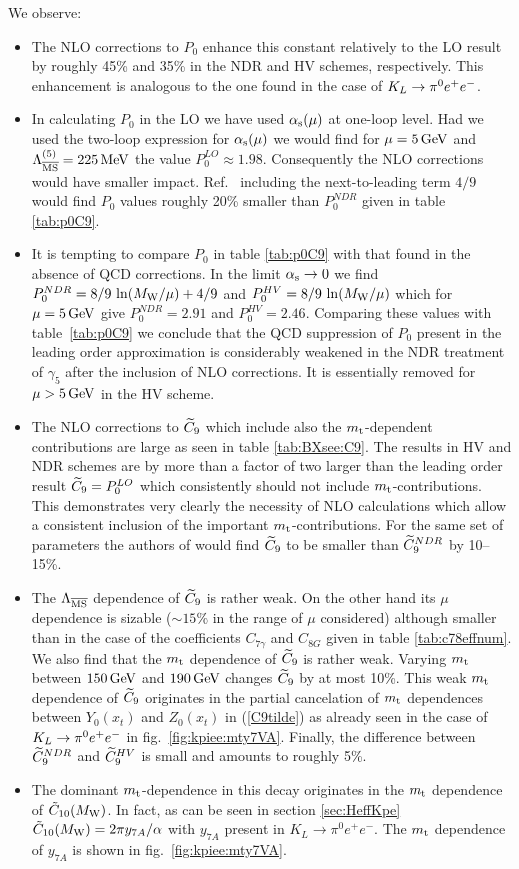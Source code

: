 \noindent
We observe:
\begin{itemize}
\item
The NLO corrections to $P_0$ enhance this constant relatively to the
LO result by roughly 45\% and 35\% in the NDR and HV schemes,
respectively. This enhancement is analogous to the one found in the
case of $K_L \to \pi^0 e^+ e^-$.
\item
In calculating $P_0$ in the LO we have used $\alpha_{\rm s}(\mu)$ at one-loop
level. Had we used the two-loop expression for $\alpha_{\rm s}(\mu)$ we
would find for $\mu=5 \, {\rm GeV}$ and $\Lambda_{\overline{\rm MS}}^{(5)} = 225 \, {\rm MeV}$ the value $P_0^{LO}
\approx 1.98$. Consequently the NLO corrections would have smaller
impact. Ref.~\cite{grinstein:89a} including the next-to-leading term $4/9$
would find $P_0$ values roughly 20\% smaller than $P_0^{NDR}$ given in
table \ref{tab:p0C9}.
\item
It is tempting to compare $P_0$ in table \ref{tab:p0C9} with that found in
the absence of QCD corrections. In the limit $\alpha_{\rm s} \to 0$ we
find $P_0^{NDR} = 8/9 \, \ln(M_{\rm W}/\mu) + 4/9$ and $P_0^{HV} = 8/9\,
\ln(M_{\rm W}/\mu)$ which for $\mu = 5 \, {\rm GeV}$ give $P_0^{NDR} = 2.91$ and
$P_0^{HV} = 2.46$. Comparing these values with table~\ref{tab:p0C9} we
conclude that the QCD suppression of $P_0$ present in the leading order
approximation is considerably weakened in the NDR treatment of
$\gamma_5$ after the inclusion of NLO corrections. It is essentially
removed for $\mu > 5 \, {\rm GeV}$ in the HV scheme.
\item
The NLO corrections to $\widetilde C_9$ which include also the
$m_{\rm t}$-dependent contributions are large as seen in table
\ref{tab:BXsee:C9}. The results in HV and NDR schemes are by more than
a factor of two larger than the leading order result $\widetilde C_9 =
P_0^{LO}$ which consistently should not include $m_{\rm t}$-contributions.
This demonstrates very clearly the necessity of NLO calculations which
allow a consistent inclusion of the important $m_{\rm t}$-contributions. For
the same set of parameters the authors of \cite{grinstein:89a}
would find $\widetilde C_9$ to be smaller than $\widetilde C_9^{NDR}$ by
10--15\%.
\item
The $\Lambda_{\overline{\rm MS}}$ dependence of $\widetilde C_9$ is rather weak.  On the other
hand its $\mu$ dependence is sizable ($\sim 15\%$ in the range of $\mu$
considered) although smaller than in the case of the coefficients
$C_{7\gamma}$ and $C_{8G}$ given in table \ref{tab:c78effnum}.  We also
find that the $m_{\rm t}$ dependence of $\widetilde C_9$ is rather weak. Varying
$m_{\rm t}$ between $150 \, {\rm GeV}$ and $190 \, {\rm GeV}$ changes $\widetilde C_9$ by at most
10\%. This weak $m_{\rm t}$ dependence of $\widetilde C_9$ originates in the
partial cancelation of $m_{\rm t}$ dependences between $Y_0(x_t)$ and
$Z_0(x_t)$ in (\ref{C9tilde}) as already seen in the case of $K_L \to \pi^0 e^+ e^-$
in fig.\ \ref{fig:kpiee:mty7VA}. Finally, the difference between
$\widetilde C_9^{NDR}$ and $\widetilde C_9^{HV}$ is small and amounts to roughly 5\%.
\item
The dominant $m_{\rm t}$-dependence in this decay originates in the $m_{\rm t}$
dependence of $\tilde C_{10}(M_{\rm W})$. In fact, as can be seen in section
\ref{sec:HeffKpe} $\tilde C_{10}(M_{\rm W})=2\pi y_{7A}/\alpha$ with $y_{7A}$
present in $K_L \to \pi^0 e^+ e^-$. The $m_{\rm t}$ dependence of $y_{7A}$ is
shown in fig.\ \ref{fig:kpiee:mty7VA}.
\end{itemize}
